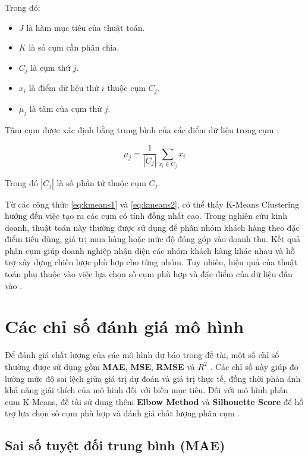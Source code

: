 Trong đó:
\begin{itemize}
    \item \(J\) là hàm mục tiêu của thuật toán.
    \item \(K\) là số cụm cần phân chia.
    \item \(C_j\) là cụm thứ \(j\).
    \item \(x_i\) là điểm dữ liệu thứ \(i\) thuộc cụm \(C_j\).
    \item \(\mu_j\) là tâm của cụm thứ \(j\).
\end{itemize}

Tâm cụm được xác định bằng trung bình của các điểm dữ liệu trong cụm \cite{sklearn_kmeans}:

\begin{equation}
\mu_j = \frac{1}{|C_j|} \sum_{x_i \in C_j} x_i
\label{eq:kmeans2}
\end{equation}

Trong đó \(|C_j|\) là số phần tử thuộc cụm \(C_j\).

Từ các công thức \eqref{eq:kmeans1} và \eqref{eq:kmeans2}, có thể thấy K-Means Clustering hướng đến việc tạo ra các cụm có tính đồng nhất cao. Trong nghiên cứu kinh doanh, thuật toán này thường được sử dụng để phân nhóm khách hàng theo đặc điểm tiêu dùng, giá trị mua hàng hoặc mức độ đóng góp vào doanh thu. Kết quả phân cụm giúp doanh nghiệp nhận diện các nhóm khách hàng khác nhau và hỗ trợ xây dựng chiến lược phù hợp cho từng nhóm. Tuy nhiên, hiệu quả của thuật toán phụ thuộc vào việc lựa chọn số cụm phù hợp và đặc điểm của dữ liệu đầu vào \cite{sklearn_kmeans}.

\section{Các chỉ số đánh giá mô hình}

Để đánh giá chất lượng của các mô hình dự báo trong đề tài, một số chỉ số thường được sử dụng gồm \textbf{MAE}, \textbf{MSE}, \textbf{RMSE} và \textbf{$R^2$} \cite{sklearn_userguide}. Các chỉ số này giúp đo lường mức độ sai lệch giữa giá trị dự đoán và giá trị thực tế, đồng thời phản ánh khả năng giải thích của mô hình đối với biến mục tiêu. Đối với mô hình phân cụm K-Means, đề tài sử dụng thêm \textbf{Elbow Method} và \textbf{Silhouette Score} để hỗ trợ lựa chọn số cụm phù hợp và đánh giá chất lượng phân cụm \cite{sklearn_kmeans,sklearn_silhouette}.

\subsection*{\thesubsection\quad Sai số tuyệt đối trung bình (MAE)}

